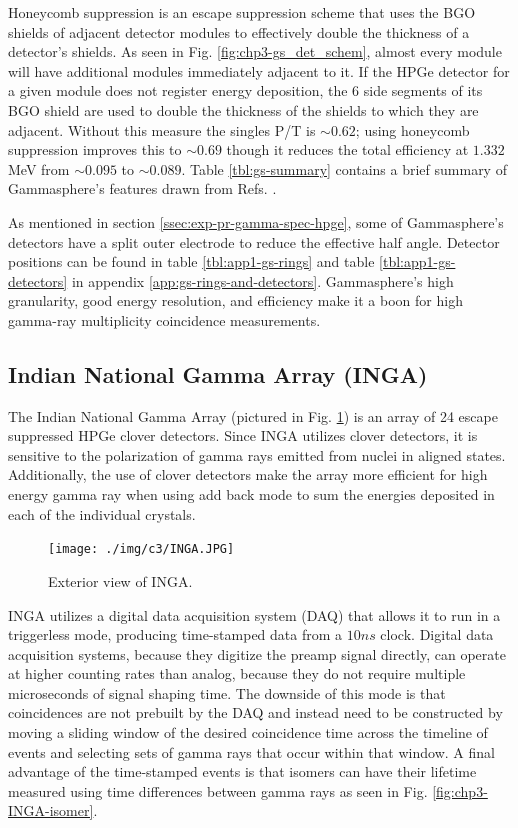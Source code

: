 Honeycomb suppression is an escape suppression scheme that uses the BGO shields of adjacent detector modules to effectively double the thickness of a detector's shields. As seen in Fig. \ref{fig:chp3-gs_det_schem}, almost every module will have additional modules immediately adjacent to it. If the HPGe detector for a given module does not register energy deposition, the 6 side segments of its BGO shield are used to double the thickness of the shields to which they are adjacent. Without this measure the singles P/T is $\sim0.62$; using honeycomb suppression improves this to $\sim0.69$ though it reduces the total efficiency at $1.332$ MeV from $\sim0.095$ to $\sim0.089$\cite{TheGS}. Table \ref{tbl:gs-summary} contains a brief summary of Gammasphere's features drawn from Refs. \cite{TheGS,SimulatedResGS,largeArrays,GSComptonSuppression}.

As mentioned in section \ref{ssec:exp-pr-gamma-spec-hpge}, some of Gammasphere's detectors have a split outer electrode to reduce the effective half angle. Detector positions can be found in table \ref{tbl:app1-gs-rings} and table \ref{tbl:app1-gs-detectors} in appendix \ref{app:gs-rings-and-detectors}. Gammasphere's high granularity, good energy resolution, and efficiency make it a boon for high gamma-ray multiplicity coincidence measurements.

\subsection{Indian National Gamma Array (INGA)}
\label{ssec:exp-pr-gamma-spec-inga}
The Indian National Gamma Array (pictured in Fig. \ref{fig:chp3-INGA}) is an array of 24 escape suppressed HPGe clover detectors\cite{ingaAtIUAC}. Since INGA utilizes clover detectors, it is sensitive to the polarization of gamma rays emitted from nuclei in aligned states\cite{cloverDet}. Additionally, the use of clover detectors make the array more efficient for high energy gamma ray when using add back mode to sum the energies deposited in each of the individual crystals.

\begin{figure}[ht!]
	\centerline{\texttt{[image: ./img/c3/INGA.JPG]}}
	\caption{Exterior view of INGA.\label{fig:chp3-INGA}}
\end{figure}

INGA utilizes a digital data acquisition system (DAQ) that allows it to run in a triggerless mode, producing time-stamped data from a $10ns$ clock\cite{IngaDigitalDAQ}. Digital data acquisition systems, because they digitize the preamp signal directly, can operate at higher counting rates than analog, because they do not require multiple microseconds of signal shaping time. The downside of this mode is that coincidences are not prebuilt by the DAQ and instead need to be constructed by moving a sliding window of the desired coincidence time across the timeline of events and selecting sets of gamma rays that occur within that window. A final advantage of the time-stamped events is that isomers can have their lifetime measured using time differences between gamma rays as seen in Fig. \ref{fig:chp3-INGA-isomer}.

